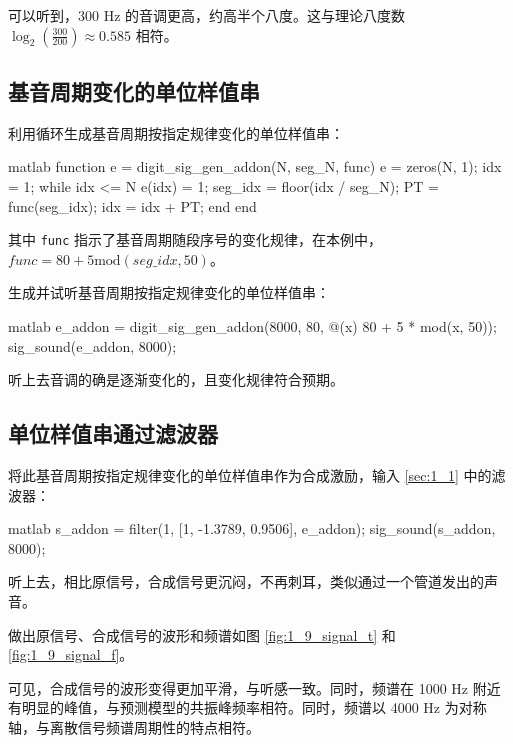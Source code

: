 \documentclass[a4paper]{article}  %
\begin{document}
可以听到，300 Hz 的音调更高，约高半个八度。这与理论八度数 $\log_2(\frac{300}{200}) \approx 0.585$ 相符。

\subsection{基音周期变化的单位样值串}

利用循环生成基音周期按指定规律变化的单位样值串：
\begin{codeblock}{matlab}
function e = digit_sig_gen_addon(N, seg_N, func)
    e = zeros(N, 1);
    idx = 1;
    while idx <= N
        e(idx) = 1;
        seg_idx = floor(idx / seg_N);
        PT = func(seg_idx);
        idx = idx + PT;
    end 
end
\end{codeblock}

其中 \texttt{func} 指示了基音周期随段序号的变化规律，在本例中，$func = 80 + 5\text{mod}(seg\_idx, 50)$。

生成并试听基音周期按指定规律变化的单位样值串：
\begin{codeblock}{matlab}
e_addon = digit_sig_gen_addon(8000, 80, @(x) 80 + 5 * mod(x, 50));
sig_sound(e_addon, 8000);
\end{codeblock}

听上去音调的确是逐渐变化的，且变化规律符合预期。

\subsection{单位样值串通过滤波器}

将此基音周期按指定规律变化的单位样值串作为合成激励，输入 \ref{sec:1_1} 中的滤波器：
\begin{codeblock}{matlab}
s_addon = filter(1, [1, -1.3789, 0.9506], e_addon);
sig_sound(s_addon, 8000);
\end{codeblock}

听上去，相比原信号，合成信号更沉闷，不再刺耳，类似通过一个管道发出的声音。

做出原信号、合成信号的波形和频谱如图 \ref{fig:1_9_signal_t} 和 \ref{fig:1_9_signal_f}。

可见，合成信号的波形变得更加平滑，与听感一致。同时，频谱在 1000 Hz 附近有明显的峰值，与预测模型的共振峰频率相符。同时，频谱以 4000 Hz 为对称轴，与离散信号频谱周期性的特点相符。
\end{document}
